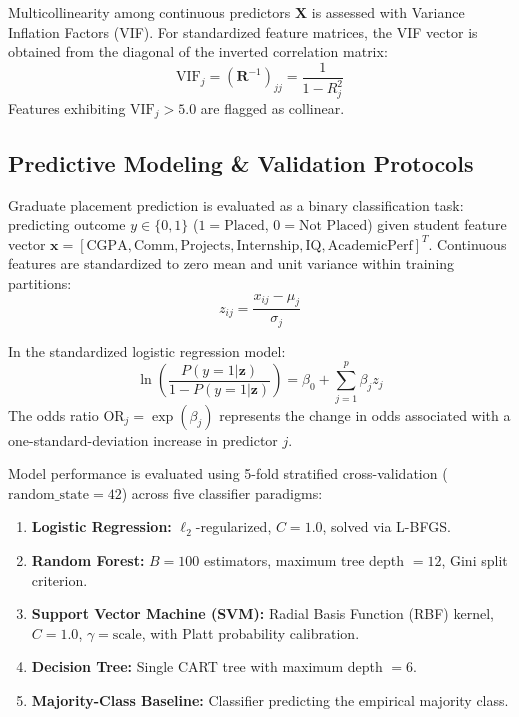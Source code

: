 \documentclass[journal]{IEEEtran}
\begin{document}
Multicollinearity among continuous predictors $\mathbf{X}$ is assessed with Variance Inflation Factors (VIF). For standardized feature matrices, the VIF vector is obtained from the diagonal of the inverted correlation matrix:
\begin{equation}
\text{VIF}_j = \left(\mathbf{R}^{-1}\right)_{jj} = \frac{1}{1 - R_j^2}
\label{eq:vif}
\end{equation}
Features exhibiting $\text{VIF}_j > 5.0$ are flagged as collinear.

\subsection{Predictive Modeling \& Validation Protocols}

Graduate placement prediction is evaluated as a binary classification task: predicting outcome $y \in \{0, 1\}$ ($1 = \text{Placed}$, $0 = \text{Not Placed}$) given student feature vector $\mathbf{x} = [\text{CGPA}, \text{Comm}, \text{Projects}, \text{Internship}, \text{IQ}, \text{AcademicPerf}]^T$. Continuous features are standardized to zero mean and unit variance within training partitions:
\begin{equation}
z_{ij} = \frac{x_{ij} - \mu_j}{\sigma_j}
\label{eq:standardize}
\end{equation}

In the standardized logistic regression model:
\begin{equation}
\ln\left(\frac{P(y=1|\mathbf{z})}{1 - P(y=1|\mathbf{z})}\right) = \beta_0 + \sum_{j=1}^p \beta_j z_j
\label{eq:logistic}
\end{equation}
The odds ratio $\text{OR}_j = \exp(\beta_j)$ represents the change in odds associated with a one-standard-deviation increase in predictor $j$.

Model performance is evaluated using 5-fold stratified cross-validation ($\text{random\_state} = 42$) across five classifier paradigms:
\begin{enumerate}
    \item \textbf{Logistic Regression:} $\ell_2$-regularized, $C = 1.0$, solved via L-BFGS.
    \item \textbf{Random Forest:} $B = 100$ estimators, maximum tree depth $= 12$, Gini split criterion.
    \item \textbf{Support Vector Machine (SVM):} Radial Basis Function (RBF) kernel, $C = 1.0$, $\gamma = \text{scale}$, with Platt probability calibration.
    \item \textbf{Decision Tree:} Single CART tree with maximum depth $= 6$.
    \item \textbf{Majority-Class Baseline:} Classifier predicting the empirical majority class.
\end{enumerate}
\end{document}
